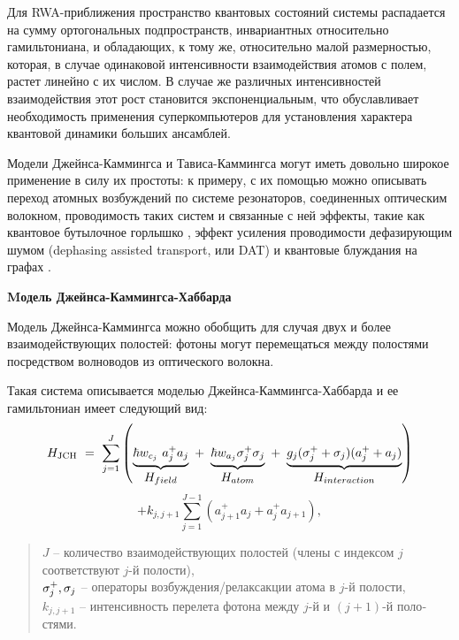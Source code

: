 Для RWA-приближения \cite{rwa_rabi_1,rwa_rabi_2,ozhigov_qq} пространство квантовых состояний системы распадается на сумму ортогональных подпространств, инвариантных относительно гамильтониана, и обладающих, к тому же, относительно малой размерностью, которая, в случае одинаковой интенсивности взаимодействия атомов с полем, растет линейно с их числом. В случае же различных интенсивностей взаимодействия этот рост становится экспоненциальным, что обуславливает необходимость применения суперкомпьютеров для установления характера квантовой динамики больших ансамблей.

Модели Джейнса-Каммингса и Тависа-Каммингса могут иметь довольно широкое применение в силу их простоты: к примеру, с их помощью можно описывать переход атомных возбуждений по системе резонаторов, соединенных оптическим волокном, проводимость таких систем \cite{skovoroda_conductivity_1,skovoroda_conductivity_2} и связанные с ней эффекты, такие как квантовое бутылочное горлышко \cite{quantum_bottleneck_victorova}, эффект усиления проводимости дефазирующим шумом (dephasing assisted transport, или DAT) \cite{dat_plenio,dat_quantum_dots} и квантовые блуждания на графах \cite{quantum_walks_ambainis,quantum_walks_ambainis_applications,quantum_walks_mixing,quantum_walks_ambainis_speedup}.

\clearpage
\indent\textbf{Mодель Джейнса-Каммингса-Хаббарда}

Модель Джейнса-Каммингса можно обобщить для случая двух и более взаимодействующих полостей: фотоны могут перемещаться между полостями посредством волноводов из оптического волокна.
\begin{figure}[h!]
	\noindent{}
\end{figure}

Такая система описывается моделью Джейнса-Каммингса-Хаббарда \cite{jch_time_evolution,jch_site_dependent_control,jch_quench_dynamics} и ее гамильтониан имеет следующий вид:
\[
H_{\text{JCH}}~=~\sum_{j=1}^J \left(\underbrace{\hbar w_{c_{j}}\ a_j^+a_{j}}_{\textstyle H_{field}}~+~\underbrace{\hbar w_{a_{j}}{\sigma_{j}^+\sigma_{j}}}_{\textstyle H_{atom}}~+~\underbrace{g_j{(\sigma_{j}^{+}+\sigma_{j})(a_{j}^{+}+a_{j})}}_{\textstyle H_{interaction}} \right)
\]
\begin{equation}
	+k_{j,j+1}\sum_{j=1}^{J-1}{\left(a_{j+1}^+a_j+a_{j}^+a_{j+1}\right)},
\end{equation}
\begin{quote}
	$J$ -- количество взаимодействующих полостей (члены с индексом $j$ соответствуют $j$-й полости),\\
	$\sigma_{j}^{+},\sigma_{j}$ -- операторы возбуждения/релаксакции атома в $j$-й полости,\\
	$k_{j,j+1}$ -- интенсивность перелета фотона между $j$-й и $(j+1)$-й поло­стями.
\end{quote}

